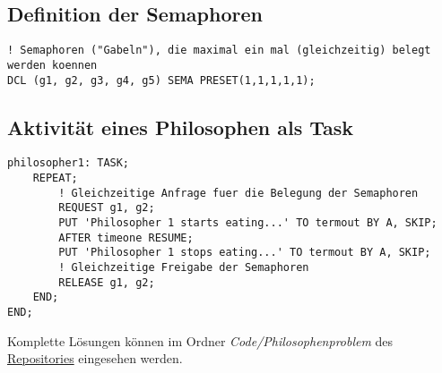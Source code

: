 \subsection{Definition der Semaphoren}
	\begin{lstlisting}
! Semaphoren ("Gabeln"), die maximal ein mal (gleichzeitig) belegt werden koennen
DCL (g1, g2, g3, g4, g5) SEMA PRESET(1,1,1,1,1);
	\end{lstlisting}
	
\subsection{Aktivität eines Philosophen als Task}
	\begin{lstlisting}
philosopher1: TASK;
	REPEAT;
		! Gleichzeitige Anfrage fuer die Belegung der Semaphoren
		REQUEST g1, g2;
		PUT 'Philosopher 1 starts eating...' TO termout BY A, SKIP;
		AFTER timeone RESUME;
		PUT 'Philosopher 1 stops eating...' TO termout BY A, SKIP;
		! Gleichzeitige Freigabe der Semaphoren
		RELEASE g1, g2;
	END;
END;
	\end{lstlisting}
	
	Komplette Lösungen können im Ordner \emph{Code/Philosophenproblem} des \href{https://github.com/OpenPearl-HFUWPV1718/SensorCar}{Repositories} eingesehen werden.